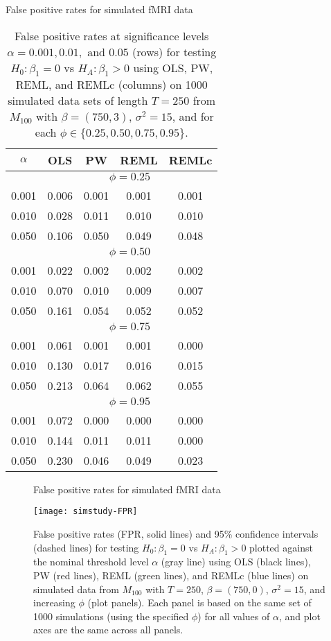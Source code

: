 \begin{table}
\ssp
\centering
\caption{False positive rates for simulated fMRI data} \label{tab:fmri:fpr}
\begin{tabular}{|c|cccc|}
\hline
$\alpha$ & OLS & PW & REML & REMLc \\
\hline
 & \multicolumn{4}{|c|}{$\phi = 0.25$} \\
\hline
0.001 & 0.006 & 0.001 & 0.001 & 0.001 \\
0.010 & 0.028 & 0.011 & 0.010 & 0.010 \\
0.050 & 0.106 & 0.050 & 0.049 & 0.048 \\
\hline
 & \multicolumn{4}{|c|}{$\phi = 0.50$} \\
\hline
0.001 & 0.022 & 0.002 & 0.002 & 0.002 \\
0.010 & 0.070 & 0.010 & 0.009 & 0.007 \\
0.050 & 0.161 & 0.054 & 0.052 & 0.052 \\
\hline
 & \multicolumn{4}{|c|}{$\phi = 0.75$} \\
\hline
0.001 & 0.061 & 0.001 & 0.001 & 0.000 \\
0.010 & 0.130 & 0.017 & 0.016 & 0.015 \\
0.050 & 0.213 & 0.064 & 0.062 & 0.055 \\
\hline
 & \multicolumn{4}{|c|}{$\phi = 0.95$} \\
\hline
0.001 & 0.072 & 0.000 & 0.000 & 0.000 \\
0.010 & 0.144 & 0.011 & 0.011 & 0.000 \\
0.050 & 0.230 & 0.046 & 0.049 & 0.023 \\
\hline
\end{tabular}
\caption*{False positive rates at significance levels $\alpha = 0.001, 0.01, \mbox{ and } 0.05$ (rows) for testing $H_0: \beta_1 = 0$ vs $H_A: \beta_1 > 0$ using OLS, PW, REML, and REMLc (columns) on 1000 simulated data sets of length $T = 250$ from $M_{100}$ with $\beta = (750, 3)$, $\sigma^2 = 15$, and for each $\phi \in \{0.25, 0.50, 0.75, 0.95\}$.}
\end{table}

\begin{figure}
\ssp
\centering
\caption{False positive rates for simulated fMRI data} \label{fig:fmri:fpr}
\texttt{[image: simstudy-FPR]}
\caption*{False positive rates (FPR, solid lines) and 95\% confidence intervals (dashed lines) for testing $H_0: \beta_1 = 0$ vs $H_A: \beta_1 > 0$ plotted against the nominal threshold level $\alpha$ (gray line) using OLS (black lines), PW (red lines), REML (green lines), and REMLc (blue lines) on simulated data from $M_{100}$ with $T = 250$, $\beta = (750, 0)$, $\sigma^2 = 15$, and increasing $\phi$ (plot panels). Each panel is based on the same set of 1000 simulations (using the specified $\phi$) for all values of $\alpha$, and plot axes are the same across all panels.}
\end{figure}

